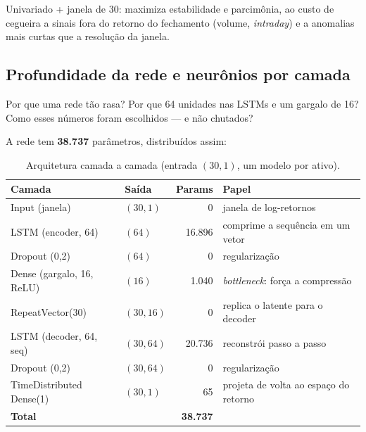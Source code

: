 \begin{tradeoff}
Univariado + janela de 30: maximiza estabilidade e parcimônia, ao custo de
cegueira a sinais fora do retorno do fechamento (volume, \emph{intraday}) e a
anomalias mais curtas que a resolução da janela.
\end{tradeoff}

\subsection{Profundidade da rede e neurônios por camada}
\label{sec:debate-arq-prof}

\begin{confronto}
Por que uma rede tão rasa? Por que 64 unidades nas LSTMs e um gargalo de 16?
Como esses números foram escolhidos --- e não chutados?
\end{confronto}

A rede tem \textbf{38.737} parâmetros, distribuídos assim:

\begin{table}[h]
\centering
\caption{Arquitetura camada a camada (entrada $(30,1)$, um modelo por ativo).}
\label{tab:camadas}
\renewcommand{\arraystretch}{1.2}
\begin{tabular}{l l r p{5.2cm}}
\toprule
\textbf{Camada} & \textbf{Saída} & \textbf{Params} & \textbf{Papel} \\
\midrule
Input (janela)            & $(30,1)$  & 0      & janela de log-retornos \\
LSTM (encoder, 64)        & $(64)$    & 16.896 & comprime a sequência em um vetor \\
Dropout (0,2)             & $(64)$    & 0      & regularização \\
Dense (gargalo, 16, ReLU) & $(16)$    & 1.040  & \emph{bottleneck}: força a compressão \\
RepeatVector(30)          & $(30,16)$ & 0      & replica o latente para o decoder \\
LSTM (decoder, 64, seq)   & $(30,64)$ & 20.736 & reconstrói passo a passo \\
Dropout (0,2)             & $(30,64)$ & 0      & regularização \\
TimeDistributed Dense(1)  & $(30,1)$  & 65     & projeta de volta ao espaço do retorno \\
\midrule
\multicolumn{2}{l}{\textbf{Total}} & \textbf{38.737} & \\
\bottomrule
\end{tabular}
\end{table}

